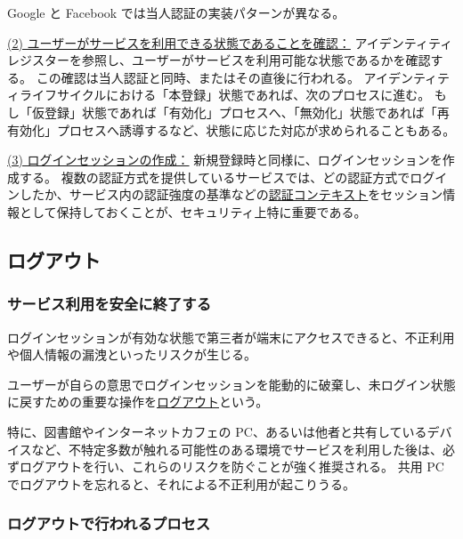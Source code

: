 \documentclass[uplatex]{jsarticle}
\def\label#1{}%
\begin{document}
\begin{exa}\label{exa:ch3-google-facebook}
Google と Facebook では当人認証の実装パターンが異なる。
\end{exa}

\underline{(2) ユーザーがサービスを利用できる状態であることを確認：}
アイデンティティレジスターを参照し、ユーザーがサービスを利用可能な状態であるかを確認する。
この確認は当人認証と同時、またはその直後に行われる。
アイデンティティライフサイクルにおける「本登録」状態であれば、次のプロセスに進む。
もし「仮登録」状態であれば「有効化」プロセスへ、「無効化」状態であれば「再有効化」プロセスへ誘導するなど、状態に応じた対応が求められることもある。

\underline{(3) ログインセッションの作成：}
新規登録時と同様に、ログインセッションを作成する。
複数の認証方式を提供しているサービスでは、どの認証方式でログインしたか、サービス内の認証強度の基準などの\underline{認証コンテキスト}をセッション情報として保持しておくことが、セキュリティ上特に重要である。

\subsection{ログアウト}

\subsubsection{サービス利用を安全に終了する}

ログインセッションが有効な状態で第三者が端末にアクセスできると、不正利用や個人情報の漏洩といったリスクが生じる。

\begin{dfn}[ログアウト]\label{dfn:logout}
ユーザーが自らの意思でログインセッションを能動的に破棄し、未ログイン状態に戻すための重要な操作を\underline{ログアウト}という。
\end{dfn}

\begin{exa}[不特定多数が触れる環境でのログアウト]\label{exa:ch3-shared-pc}
特に、図書館やインターネットカフェの PC、あるいは他者と共有しているデバイスなど、不特定多数が触れる可能性のある環境でサービスを利用した後は、必ずログアウトを行い、これらのリスクを防ぐことが強く推奨される。
共用 PC でログアウトを忘れると、それによる不正利用が起こりうる。
\end{exa}

\subsubsection{ログアウトで行われるプロセス}
\end{document}
